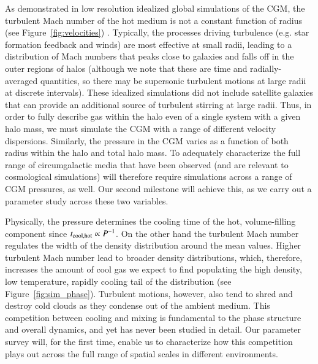 \documentclass[11pt,letterpaper,english]{article}
\begin{document}
As demonstrated in low resolution idealized global simulations of the CGM, the turbulent Mach number of the hot medium is not a constant function of radius (see Figure~\ref{fig:velocities}) \cite{Fielding17}. Typically, the processes driving turbulence (e.g. star formation feedback and winds) are most effective at small radii, leading to a distribution of Mach numbers that peaks close to galaxies and falls off in the outer regions of halos (although we note that these are time and radially-averaged quantities, so there may be supersonic turbulent motions at large radii at discrete intervals). These idealized simulations did not include satellite galaxies that can provide an additional source of turbulent stirring at large radii. Thus, in order to fully describe gas within the halo even of a single system with a given halo mass, we must simulate the CGM with a range of different velocity dispersions. Similarly, the pressure in the CGM varies as a function of both radius within the halo and total halo mass. To adequately characterize the full range of circumgalactic media that have been observed (and are relevant to cosmological simulations) will therefore require simulations across a range of CGM pressures, as well. Our second milestone will achieve this, as we carry out a parameter study across these two variables.


Physically, the pressure determines the cooling time of the hot, volume-filling component since $t_{\rm cool, hot} \propto P^{-1}$. On the other hand the turbulent Mach number regulates the width of the density distribution around the mean values. Higher turbulent Mach number lead to broader density distributions, which, therefore, increases the amount of cool gas we expect to find populating the high density, low temperature, rapidly cooling tail of the distribution (see Figure~\ref{fig:sim_phase}). Turbulent motions, however, also tend to shred and destroy cold clouds as they condense out of the ambient medium. This competition between cooling and mixing is fundamental to the phase structure and overall dynamics, and yet has never been studied in detail. Our parameter survey will, for the first time, enable us to characterize how this competition plays out across the full range of spatial scales in different environments.
\end{document}

